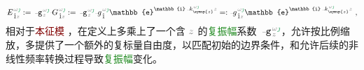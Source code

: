 \begin{subequations}
\begin{align}
	\Xint{\mathcolor{gray}{-}}{30}{E}^{\;\!\mathcolor{gray}{\omega} \textcolor{ForestGreen}{\jmath}}_{\;\! \hat{1} \mathcolor{gray}{z}} := \Xint{\begin{smallmatrix} ~ \\ {}^{}_{\mathcolor{gray}{-}} \\ ~ \end{smallmatrix}}{09}{\mathtt{g}}^{\;\!\mathcolor{gray}{\omega} \textcolor{ForestGreen}{\jmath}}_{\;\! \mathcolor{gray}{z}} \Xint{\mathcolor{gray}{-}}{20}{G}^{\;\!\mathcolor{gray}{\omega} \textcolor{ForestGreen}{\jmath}}_{\;\! \hat{1} \mathcolor{gray}{z}} := \Xint{\begin{smallmatrix} ~ \\ {}^{}_{\mathcolor{gray}{-}} \\ ~ \end{smallmatrix}}{09}{\mathtt{g}}^{\;\!\mathcolor{gray}{\omega} \textcolor{ForestGreen}{\jmath}}_{\;\! \mathcolor{gray}{z}} \Xint{{}^{}_{\mathcolor{gray}{-}}}{10}{g}^{\;\!\mathcolor{gray}{\omega} \textcolor{ForestGreen}{\jmath}}_{\;\! \hat{1}} \mathbb{e}^{\mathbb{i} \Xint{\begin{smallmatrix} ~ \\ {}^{}_{\mathcolor{gray}{-}} \\ ~ \end{smallmatrix}}{15}{k}_{\symup{z}}^{\;\! \mathcolor{gray}{\omega} \textcolor{ForestGreen}{\jmath}} \mathcolor{gray}{z}} =: \Xint{{}^{}_{\mathcolor{gray}{-}}}{10}{g}^{\;\!\mathcolor{gray}{\omega} \textcolor{ForestGreen}{\jmath}}_{\;\! \hat{1} \mathcolor{gray}{z}} \mathbb{e}^{\mathbb{i} \Xint{\begin{smallmatrix} ~ \\ {}^{}_{\mathcolor{gray}{-}} \\ ~ \end{smallmatrix}}{15}{k}_{\symup{z}}^{\;\! \mathcolor{gray}{\omega} \textcolor{ForestGreen}{\jmath}} \mathcolor{gray}{z}} ~, \label{eq:components-eigenwave}
\end{align}
\end{subequations}
相对于\textcolor{Maroon}{本征模} ，在定义上多乘上了一个含 $\mathcolor{gray}{z}$ 的\textcolor{ForestGreen}{复振幅}系数 $\Xint{\begin{smallmatrix} ~ \\ {}^{}_{\mathcolor{gray}{-}} \\ ~ \end{smallmatrix}}{09}{\mathtt{g}}^{\;\!\mathcolor{gray}{\omega} \textcolor{ForestGreen}{\jmath}}_{\;\! \mathcolor{gray}{z}}$，允许按比例缩放，多提供了一个额外的复标量自由度，以匹配初始的边界条件，和允许后续的非线性频率转换过程导致\textcolor{ForestGreen}{复振幅}变化。


